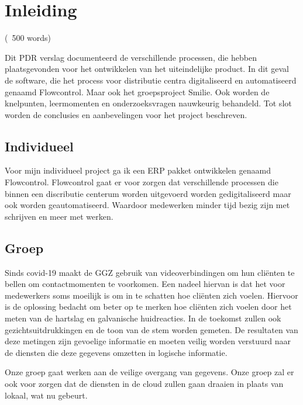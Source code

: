 \chapter{Inleiding}
\label{ch:introduction}
(~500 words)

Dit PDR verslag documenteerd de verschillende processen, die hebben plaatsgevonden voor het ontwikkelen van het uiteindelijke product.
In dit geval de software, die het process voor distributie centra digitaliseerd en automatiseerd genaamd Flowcontrol.
Maar ook het groepsproject Smilie.
Ook worden de knelpunten, leermomenten en onderzoeksvragen nauwkeurig behandeld.
Tot slot worden de conclusies en aanbevelingen voor het project beschreven.


\section*{Individueel}
Voor mijn individueel project ga ik een ERP pakket ontwikkelen genaamd Flowcontrol.
Flowcontrol gaat er voor zorgen dat verschillende processen die binnen een discributie centerum worden uitgevoerd worden gedigitaliseerd maar ook worden geautomatiseerd.
Waardoor medewerken minder tijd bezig zijn met schrijven en meer met werken.

\section*{Groep}
Sinds covid-19 maakt de GGZ gebruik van videoverbindingen om hun cli\"enten te bellen om contactmomenten te voorkomen.
Een nadeel hiervan is dat het voor medewerkers soms moeilijk is om in te schatten hoe cli\"enten zich voelen.
Hiervoor is de oplossing bedacht om beter op te merken hoe cli\"enten zich voelen door het meten van de hartslag en galvanische huidreacties.
In de toekomst zullen ook gezichtsuitdrukkingen en de toon van de stem worden gemeten.
De resultaten van deze metingen zijn gevoelige informatie en moeten veilig worden verstuurd naar de diensten die deze gegevens omzetten in logische informatie.

Onze groep gaat werken aan de veilige overgang van gegevens.
Onze groep zal er ook voor zorgen dat de diensten in de cloud zullen gaan draaien in plaats van lokaal, wat nu gebeurt.
